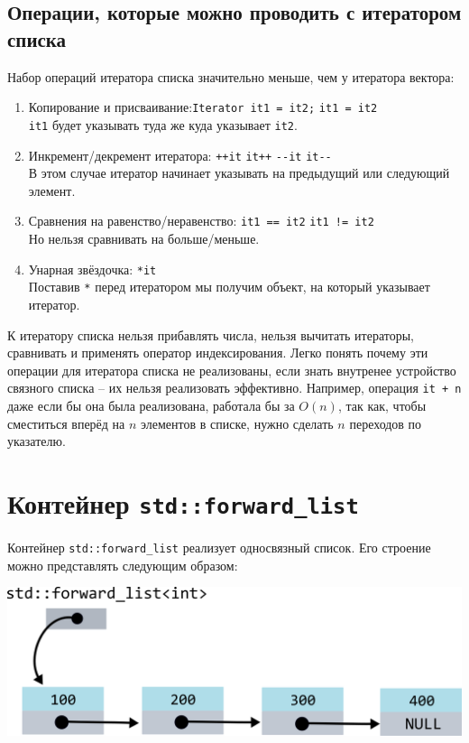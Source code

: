 \documentclass{article}
\begin{document}
\subsection*{Операции, которые можно проводить с итератором списка}
Набор операций итератора списка значительно меньше, чем у итератора вектора:
\begin{enumerate}
\item Копирование и присваивание:\quad \texttt{Iterator it1 = it2;} \quad \texttt{it1 = it2}\\
\texttt{it1} будет указывать туда же куда указывает \texttt{it2}.
\item Инкремент/декремент итератора: \quad \texttt{++it} \quad \texttt{it++} \quad \texttt{-{}-it} \quad \texttt{it-{}-}\\
В этом случае итератор начинает указывать на предыдущий или следующий элемент.
\item Сравнения на равенство/неравенство:  \quad\texttt{it1 == it2} \quad  \texttt{it1 != it2} \\
Но нельзя сравнивать на больше/меньше.
\item Унарная звёздочка: \quad \texttt{*it}\\
Поставив \texttt{*} перед итератором мы получим объект, на который указывает итератор.
\end{enumerate} 
К итератору списка нельзя прибавлять числа, нельзя вычитать итераторы, сравнивать и применять оператор индексирования. Легко понять почему эти операции для итератора списка не реализованы, если знать внутренее устройство связного списка -- их нельзя реализовать эффективно. Например, операция \texttt{it + n} даже если бы она была реализована, работала бы за $O(n)$, так как, чтобы сместиться вперёд на $n$ элементов в списке, нужно сделать $n$ переходов по указателю.



\section*{Контейнер \texttt{std::forward\_list}}
Контейнер \texttt{std::forward\_list} реализует односвязный список.
Его строение можно представлять следующим образом: 

\begin{center}
\includegraphics[scale=0.8]{../images/forward_list_internals.png}
\end{center}
\end{document}
